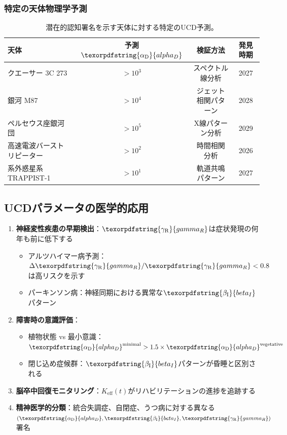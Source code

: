 \documentclass[11pt,a4paper]{article}
\DeclareRobustCommand{\alD}{\texorpdfstring{\ensuremath{\alpha_{\mathrm{D}}}}{alpha_D}}
\DeclareRobustCommand{\beI}{\texorpdfstring{\ensuremath{\beta_{\mathrm{I}}}}{beta_I}}
\DeclareRobustCommand{\gaR}{\texorpdfstring{\ensuremath{\gamma_{\mathrm{R}}}}{gamma_R}}
\newcommand{\eff}{\mathrm{eff}}
\newcommand{\Ke}{K_{\eff}}
\begin{document}
	\subsubsection{特定の天体物理学予測}
	
	\begin{table}[ht]
		\centering
		\begin{tabular}{lccc}
			\toprule
			\textbf{天体} & \textbf{予測\(\alD\)} & \textbf{検証方法} & \textbf{発見時期} \\
			\midrule
			クエーサー 3C 273 & \(>10^3\) & スペクトル線分析 & 2027 \\
			銀河 M87 & \(>10^4\) & ジェット相関パターン & 2028 \\
			ペルセウス座銀河団 & \(>10^5\) & X線パターン分析 & 2029 \\
			高速電波バーストリピーター & \(>10^2\) & 時間相関分析 & 2026 \\
			系外惑星系 TRAPPIST-1 & \(>10^1\) & 軌道共鳴パターン & 2027 \\
			\bottomrule
		\end{tabular}
		\caption{潜在的認知署名を示す天体に対する特定のUCD予測。}
		\label{tab:astro-predictions}
	\end{table}
	
	\subsection{UCDパラメータの医学的応用}
	
	\begin{enumerate}
		\item \textbf{神経変性疾患の早期検出}：\(\gaR\)は症状発現の何年も前に低下する
		\begin{itemize}
			\item アルツハイマー病予測：\(\Delta\gaR/\gaR < 0.8\)は高リスクを示す
			\item パーキンソン病：神経同期における異常な\(\beI\)パターン
		\end{itemize}
		
		\item \textbf{障害時の意識評価}：
		\begin{itemize}
			\item 植物状態 vs 最小意識：\(\alD^{\mathrm{minimal}} > 1.5 \times \alD^{\mathrm{vegetative}}\)
			\item 閉じ込め症候群：\(\beI\)パターンが昏睡と区別される
		\end{itemize}
		
		\item \textbf{脳卒中回復モニタリング}：\(\Ke(t)\)がリハビリテーションの進捗を追跡する
		\item \textbf{精神医学的分類}：統合失調症、自閉症、うつ病に対する異なる\((\alD, \beI, \gaR)\)署名
	\end{enumerate}
	
\end{document}
